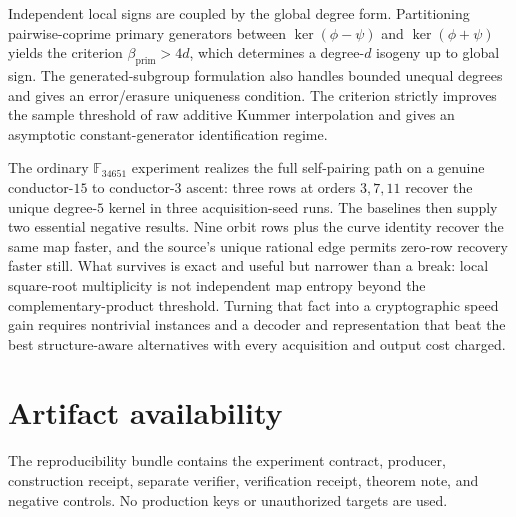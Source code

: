 \documentclass[11pt]{article}
\newcommand{\F}{\mathbb{F}}
\newcommand{\betaP}{\beta_{\mathrm{prim}}}
\begin{document}
Independent local signs are coupled by the global degree form.  Partitioning
pairwise-coprime primary generators between $\ker(\phi-\psi)$ and
$\ker(\phi+\psi)$ yields the criterion $\betaP>4d$, which determines a
degree-$d$ isogeny up to global sign.  The generated-subgroup formulation
also handles bounded unequal degrees and gives an error/erasure uniqueness
condition.  The criterion strictly improves the sample threshold of raw
additive Kummer interpolation and gives an asymptotic constant-generator
identification regime.

The ordinary $\F_{34651}$ experiment realizes the full self-pairing path on a
genuine conductor-$15$ to conductor-$3$ ascent: three rows at orders
$3,7,11$ recover the unique degree-$5$ kernel in three acquisition-seed runs.
The baselines then supply two essential negative results.  Nine orbit rows
plus the curve identity recover the same map faster, and the source's unique
rational edge permits zero-row recovery faster still.  What survives is exact
and useful but narrower than a break: local square-root multiplicity is not
independent map entropy beyond the complementary-product threshold.  Turning
that fact into a cryptographic speed gain requires nontrivial instances and a
decoder and representation that beat the best structure-aware alternatives
with every acquisition and output cost charged.

\section*{Artifact availability}

The reproducibility bundle contains the experiment contract, producer,
construction receipt, separate verifier, verification receipt, theorem
note, and negative controls.  No production keys or unauthorized targets are
used.

\begingroup
\footnotesize

\endgroup
\end{document}
